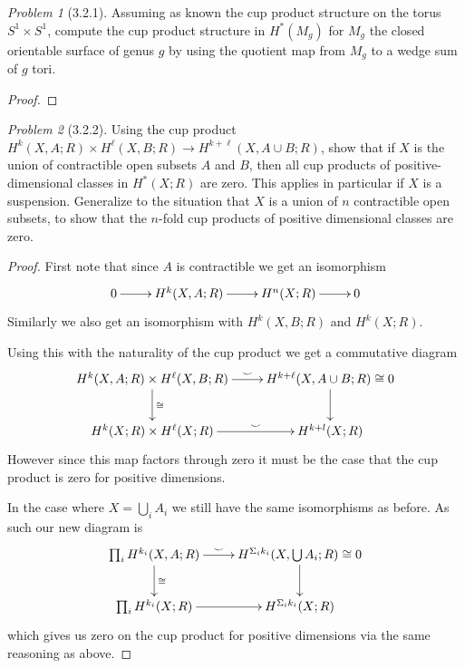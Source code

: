 \documentclass[10pt]{article}
\newcommand{\sk}{\vskip 10mm}
\theoremstyle{remark}
\newtheorem{problem}{Problem}
\begin{document}
\begin{problem}[3.2.1]
  Assuming as known the cup product structure on the torus $S^1\times S^1$,
  compute the cup product structure in $H^*(M_g)$ for $M_g$ the closed
  orientable surface of genus $g$ by using the quotient map from $M_g$
  to a wedge sum of $g$ tori.
\end{problem}

\begin{proof}
  
\end{proof}

\sk

\begin{problem}[3.2.2]
  Using the cup product
  $H^k(X,A;R)\times H^\ell(X,B;R)\rightarrow H^{k+\ell}(X,A\cup B;R)$, show that
  if $X$ is the union of contractible open subsets $A$ and $B$, then all cup
  products of positive-dimensional classes in $H^*(X;R)$ are zero. This applies
  in particular if $X$ is a suspension. Generalize to the situation that $X$ is
  a union of $n$ contractible open subsets, to show that the $n$-fold cup
  products of positive dimensional classes are zero.
\end{problem}

\begin{proof}
  First note that since $A$ is contractible we get an isomorphism
  \[
    \xymatrix{
      0 \ar[r] & H^k(X,A;R) \ar[r] & H^n(X;R) \ar[r] & 0
    }
  \]
  Similarly we also get an isomorphism with $H^k(X,B;R)$ and $H^k(X;R)$.

  Using this with the naturality of the cup product we get a commutative
  diagram
  \[
    \xymatrix{
      H^k(X,A;R)\times H^\ell(X,B;R) \ar[r]^-\smile \ar[d]^{\cong }& H^{k+\ell}(X,A\cup B;R)\cong 0 \ar[d]\\
      H^k(X;R)\times H^\ell(X;R) \ar[r]^-\smile & H^{k+l}(X;R)
    }
  \]
  However since this map factors through zero it must be the case that
  the cup product is zero for positive dimensions.

  In the case where $X=\bigcup_i A_i$ we still have the same isomorphisms as before.
  As such our new diagram is
  \[
    \xymatrix{
      \prod_i H^{k_i}(X,A;R) \ar[r]^-{\smile} \ar[d]^{\cong}& H^{\Sigma_ik_i}(X,\bigcup A_i;R)\cong 0 \ar[d]\\
      \prod_i H^{k_i}(X;R) \ar[r] & H^{\Sigma_i k_i}(X;R)
    }
  \]
  which gives us zero on the cup product for positive dimensions via the same
  reasoning as above.
\end{proof}
\end{document}
